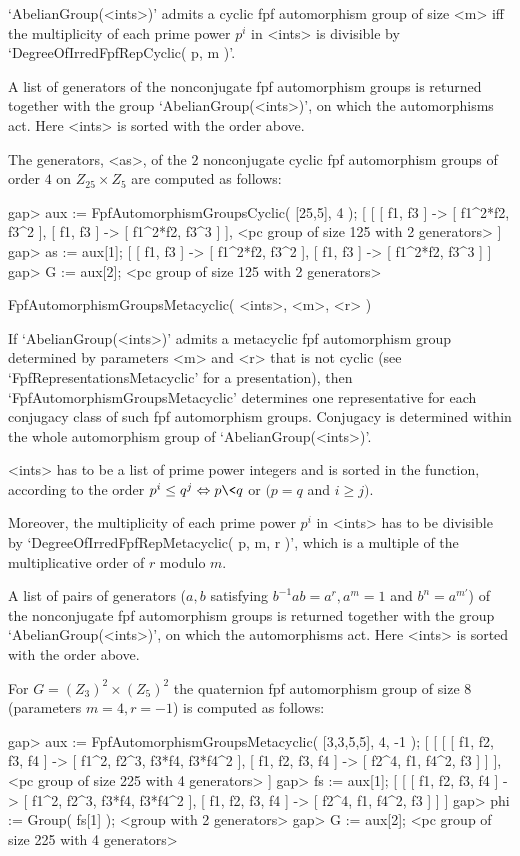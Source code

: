 `AbelianGroup(<ints>)' admits a cyclic fpf automorphism group
of size <m> iff the multiplicity of each prime power $p^i$ in <ints>
is divisible by `DegreeOfIrredFpfRepCyclic( p, m )'.

A list of generators of the nonconjugate fpf automorphism groups is returned
together with the group `AbelianGroup(<ints>)', on which the automorphisms act.
Here <ints> is sorted with the order above.

The generators, <as>, of the $2$ nonconjugate cyclic fpf
automorphism groups of order $4$ on $Z_{25}\times Z_{5}$ are computed
as follows:

\beginexample
    gap> aux := FpfAutomorphismGroupsCyclic( [25,5], 4 ); 
    [ [ [ f1, f3 ] -> [ f1^2*f2, f3^2 ], 
          [ f1, f3 ] -> [ f1^2*f2, f3^3 ] ], 
      <pc group of size 125 with 2 generators> ]
    gap> as := aux[1];
    [ [ f1, f3 ] -> [ f1^2*f2, f3^2 ], [ f1, f3 ] -> [ f1^2*f2, f3^3 ] ]
    gap> G := aux[2];
    <pc group of size 125 with 2 generators>
\endexample

\>FpfAutomorphismGroupsMetacyclic( <ints>, <m>, <r> )

If `AbelianGroup(<ints>)' admits a metacyclic fpf automorphism group 
determined by parameters <m> and <r> that is not cyclic
(see `FpfRepresentationsMetacyclic' for a presentation),
then `FpfAutomorphismGroupsMetacyclic' determines one
representative for each conjugacy class of such fpf automorphism groups. 
Conjugacy is determined within the whole automorphism group of 
`AbelianGroup(<ints>)'. 

<ints> has to be a list of prime power integers and is sorted in the
function, according to the order
$p^i\leq q^j \Leftrightarrow p \< q$ or $(p = q$ and $i\geq j)$. 

Moreover, the multiplicity of each prime power $p^i$ in <ints> has to be
divisible by `DegreeOfIrredFpfRepMetacyclic( p, m, r )', which is 
a multiple of the multiplicative order of $r$ modulo $m$.

A list of pairs of generators ($a,b$ satisfying $b^{-1}ab = a^r, a^m = 1$
and $b^n = a^{m'}$) of the nonconjugate fpf automorphism groups is returned
together with the group `AbelianGroup(<ints>)', on which the automorphisms act.
Here <ints> is sorted with the order above.

For $G = (Z_{3})^2\times(Z_{5})^2$ the quaternion
fpf automorphism group of size $8$ (parameters $m = 4, r = -1$) is computed as
follows:

\beginexample
    gap> aux := FpfAutomorphismGroupsMetacyclic( [3,3,5,5], 4, -1 );
    [ [ [ [ f1, f2, f3, f4 ] -> [ f1^2, f2^3, f3*f4, f3*f4^2 ], 
              [ f1, f2, f3, f4 ] -> [ f2^4, f1, f4^2, f3 ] ] ], 
      <pc group of size 225 with 4 generators> ]
    gap> fs := aux[1];
    [ [ [ f1, f2, f3, f4 ] -> [ f1^2, f2^3, f3*f4, f3*f4^2 ], 
          [ f1, f2, f3, f4 ] -> [ f2^4, f1, f4^2, f3 ] ] ]
    gap> phi := Group( fs[1] );
    <group with 2 generators>
    gap> G := aux[2];
    <pc group of size 225 with 4 generators>
\endexample

